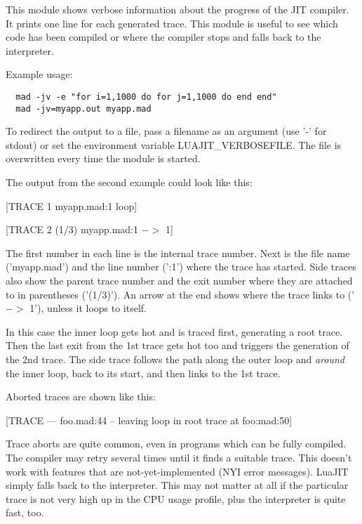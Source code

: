 
This module shows verbose information about the progress of the
JIT compiler. It prints one line for each generated trace. This module
is useful to see which code has been compiled or where the compiler
stops and falls back to the interpreter.

Example usage:

\begin{lstlisting}
  mad -jv -e "for i=1,1000 do for j=1,1000 do end end"
  mad -jv=myapp.out myapp.mad
\end{lstlisting}
To redirect the output to a file, pass a
filename as an argument (use '-' for stdout) or set the environment
variable LUAJIT\_VERBOSEFILE. The file is overwritten every time the
module is started.

The output from the second example could look like this:

\begin{center}
[TRACE   1 myapp.mad:1 loop]

[TRACE   2 (1/3) myapp.mad:1 $->$ 1]
\end{center}

The first number in each line is the internal trace number. Next is
the file name ('myapp.mad') and the line number (':1') where the
trace has started. Side traces also show the parent trace number and
the exit number where they are attached to in parentheses ('(1/3)').
An arrow at the end shows where the trace links to ('$->$ 1'), unless
it loops to itself.

In this case the inner loop gets hot and is traced first, generating
a root trace. Then the last exit from the 1st trace gets hot too
and triggers the generation of the 2nd trace. The side trace follows the
path along the outer loop and \textit{around} the inner loop, back to its
start, and then links to the 1st trace.

Aborted traces are shown like this:
\begin{center}
[TRACE --- foo.mad:44 -- leaving loop in root trace at foo:mad:50]
\end{center}

Trace aborts are quite common, even in programs which
can be fully compiled. The compiler may retry several times until it
finds a suitable trace. This doesn't work with features that are
not-yet-implemented (NYI error messages). LuaJIT simply falls back to the
interpreter. This may not matter at all if the particular trace is not very high
up in the CPU usage profile, plus the interpreter is quite fast, too.